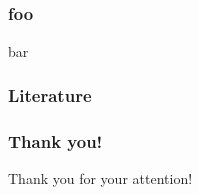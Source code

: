 \documentclass[12pt]{beamer}
\begin{document}
\subsection*{}
	\begin{frame}
		\frametitle{foo}
		bar
	\end{frame}
	\begin{frame}
	\frametitle{Literature}
		\nocite{*}
		\def\newblock{}
		
		
	\end{frame}

	\begin{frame}
		\frametitle{Thank you!}
		\begin{center}
			Thank you for your attention!
		\end{center}
	\end{frame}	
\end{document}
